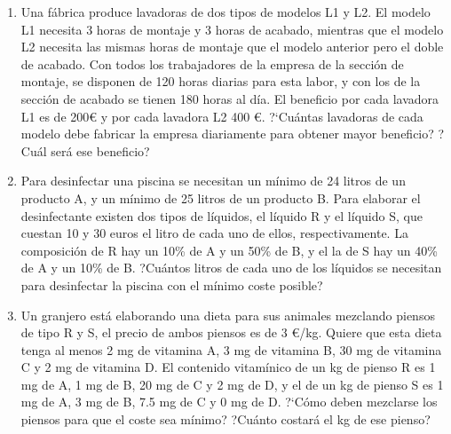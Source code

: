 \begin{adjustwidth}{20pt}{10pt}
\begin{enumerate}[PB. 1. ]
\item Una fábrica produce lavadoras de dos tipos de modelos L1 y L2. El modelo L1 necesita 3 horas de montaje y 3 horas de acabado, mientras que el modelo L2 necesita las mismas horas de montaje que el modelo anterior pero el doble de acabado. Con todos los trabajadores de la empresa de la sección de montaje, se disponen de 120 horas diarias para esta labor, y con los de la sección de acabado se tienen 180 horas al día. El beneficio por cada lavadora L1 es de 200€ y por cada lavadora L2 400 \euro. ?`Cuántas lavadoras de cada modelo debe fabricar la empresa diariamente para obtener mayor beneficio? ?Cuál será ese beneficio?

\hspace{-15mm}

\hspace{-15mm}\vspace{1cm}




\item Para desinfectar una piscina se necesitan un mínimo de 24 litros de un producto A, y un mínimo de 25 litros de un producto B. Para elaborar el desinfectante existen dos tipos de líquidos, el líquido R y el líquido S, que cuestan 10 y 30 euros el litro de cada uno de ellos, respectivamente. La composición de R hay un 10\% de A y un 50\% de B, y el la de S hay un 40\% de A y un 10\% de B. ?Cuántos litros de cada uno de los líquidos se necesitan para desinfectar la piscina con el mínimo coste posible?

\hspace{-15mm}\vspace{1cm}



\item Un granjero está elaborando una dieta para sus animales mezclando piensos de tipo R y S, el precio de ambos piensos es de 3 \euro /kg. Quiere que esta dieta tenga al menos 2 mg de vitamina A, 3 mg de vitamina B, 30 mg de vitamina C y 2 mg de vitamina D. El contenido vitamínico de un kg de pienso R es 1 mg de A, 1 mg de B, 20 mg de C y 2 mg de D, y el de un kg de pienso S es 1 mg de A, 3 mg de B, 7.5 mg de C y 0 mg de D. ?`Cómo deben mezclarse los piensos para que el coste sea mínimo? ?Cuánto costará el kg de ese pienso?


\end{enumerate}
\end{adjustwidth}
